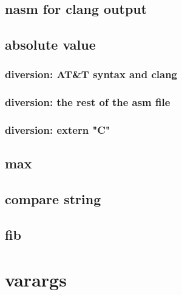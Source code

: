 

\subsection{nasm for clang output}



\subsection{absolute value}





\subsubsection{diversion: AT\&T syntax and clang}





\subsubsection{diversion: the rest of the asm file}


\subsubsection{diversion: extern "C"}



\subsection{max}







\subsection{compare string}





\subsection{fib}





\section{varargs}
